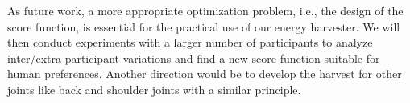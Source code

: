 \documentclass[twocolumn]{svjour3}          %
\begin{document}
As future work, a more appropriate optimization problem, i.e., the design of the score function, is essential for the practical use of our energy harvester.
We will then conduct experiments with a larger number of participants to analyze inter/extra participant variations and find a new score function suitable for human preferences.
Another direction would be to develop the harvest for other joints like back and shoulder joints with a similar principle.


\end{document}
